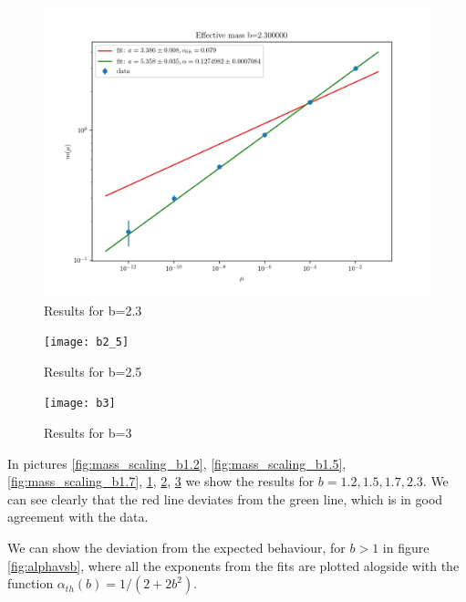 \documentclass[12pt,a4paper]{report}
\begin{document}
 \begin{figure}
\centering
\includegraphics[width=1.0\textwidth]{b2_3}
\caption{Results for b=2.3}
\label{fig:mass_scaling_b2.3}
\end{figure}  
  
 \begin{figure}
\centering
\texttt{[image: b2\_5]}
\caption{Results for b=2.5}
\label{fig:mass_scaling_b2.5}
\end{figure}

 \begin{figure}
\centering
\texttt{[image: b3]}
\caption{Results for b=3}
\label{fig:mass_scaling_b3}
\end{figure}

In pictures \ref{fig:mass_scaling_b1.2}, \ref{fig:mass_scaling_b1.5}, \ref{fig:mass_scaling_b1.7}, \ref{fig:mass_scaling_b2.3}, \ref{fig:mass_scaling_b2.5}, \ref{fig:mass_scaling_b3} we show the results for $b=1.2,1.5,1.7,2.3$. We can see clearly that the red line deviates from the green line, which is in good agreement with the data. 

We can show the deviation from the expected behaviour, for $b>1$ in figure \ref{fig:alphavsb}, where all the exponents from the fits are plotted alogside with the function $\alpha_{th}(b)=1/(2+2b^2)$.
\end{document}
